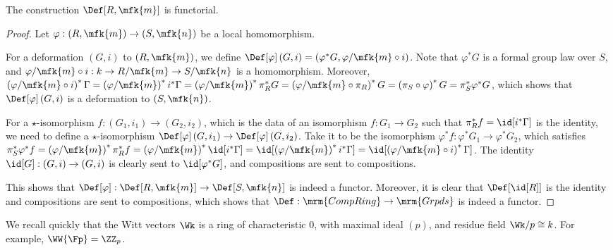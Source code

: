 \begin{proposition}[/definition]
	The construction $\Def[R, \mfk{m}]$ is functorial.
\end{proposition}

\begin{proof}
	Let $\varphi: \left(R, \mfk{m}\right) \to \left(S, \mfk{n}\right)$ be a local homomorphism.
	
	For a deformation $\left(G, i\right)$ to $\left(R, \mfk{m}\right)$, we define
	$
	\Def[\varphi]\left(G, i\right)
	= \left(\varphi^* G, \varphi/\mfk{m} \circ i\right)
	$.
	Note that $\varphi^* G$ is a formal group law over $S$, and $\varphi/\mfk{m} \circ i: k \to R/\mfk{m} \to S/\mfk{n}$ is a homomorphism.
	Moreover,
	$
	\left(\varphi/\mfk{m} \circ i\right)^* \Gamma
	= \left(\varphi/\mfk{m}\right)^* i^* \Gamma
	= \left(\varphi/\mfk{m}\right)^* \pi_R^* G
	= \left(\varphi/\mfk{m} \circ \pi_R\right)^* G
	= \left(\pi_S \circ \varphi\right)^* G
	= \pi_S^* \varphi^* G
	$,
	which shows that $\Def[\varphi]\left(G, i\right)$ is a deformation to $\left(S, \mfk{n}\right)$.
	
	For a $\star$-isomorphism $f: \left(G_1, i_1\right) \to \left(G_2, i_2\right)$, which is the data of an isomorphism $f: G_1 \to G_2$ such that $\pi_R^* f = \id[i^*\Gamma]$ is the identity, we need to define a $\star$-isomorphism $\Def[\varphi]\left(G, i_1\right) \to \Def[\varphi]\left(G, i_2\right)$.
	Take it to be the isomorphism $\varphi^* f: \varphi^* G_1 \to \varphi^* G_2$, which satisfies
	$
	\pi_S^* \varphi^* f
	= \left(\varphi/\mfk{m}\right)^* \pi_R^* f
	= \left(\varphi/\mfk{m}\right)^* \id[i^*\Gamma]
	= \id[\left(\varphi/\mfk{m}\right)^* i^*\Gamma]
	= \id[\left(\varphi/\mfk{m} \circ i \right)^*\Gamma]
	$.
	The identity $\id[G]: \left(G, i\right) \to \left(G, i\right)$ is clearly sent to $\id[\varphi^* G]$, and compositions are sent to compositions.
	
	This shows that $\Def[\varphi]: \Def[R, \mfk{m}] \to \Def[S, \mfk{n}]$ is indeed a functor.
	Moreover, it is clear that $\Def[{\id[R]}]$ is the identity and compositions are sent to compositions, which shows that $\Def: \mrm{CompRing} \to \mrm{Grpds}$ is indeed a functor.
\end{proof}

\begin{remark}
	We recall quickly that the Witt vectors $\Wk$ is a ring of characteristic $0$, with maximal ideal $\left(p\right)$, and residue field $\Wk/p \cong k$.
	For example, $\WW{\Fp} = \ZZ_p$.
\end{remark}

